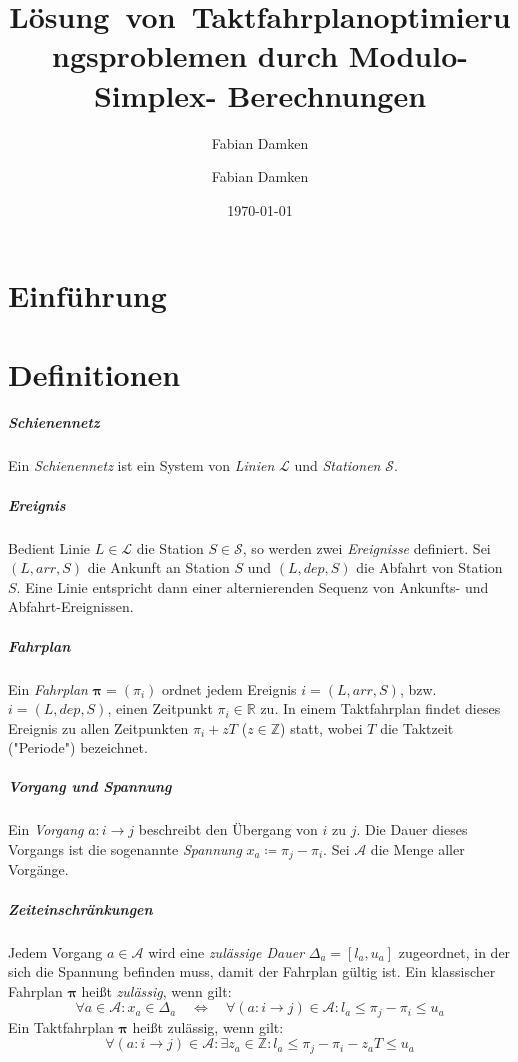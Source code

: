 \documentclass[accentcolor = tud11b, a4paper, 11pt, tudmathserif]{tudexercise}
\title{Lösung~von~Takt\-fahr\-plan\-op\-ti\-mie\-rungs\-pro\-ble\-men durch Mo\-du\-lo-Sim\-plex- Be\-rech\-nung\-en}
\subtitle{Fabian Damken}
\author{Fabian Damken}
\date{\today}
\newcommand{\arr}{\mathit{arr}}
\newcommand{\dep}{\mathit{dep}}
\newcommand{\R}{\ensuremath{\mathbb{R}}}
\newcommand{\Z}{\ensuremath{\mathbb{Z}}}
\renewcommand{\vec}[1]{\boldsymbol{\mathbf{#1}}}
\begin{document}
	

	\maketitle
	
	\section*{Einführung}

	\section*{Definitionen}
		\subparagraph{Schienennetz}
		Ein \emph{Schienennetz} ist ein System von \emph{Linien} \(\mathcal{L}\) und \emph{Stationen} \(\mathcal{S}\).
	
		\subparagraph{Ereignis}
		Bedient Linie \( L \in \mathcal{L} \) die Station \( S \in \mathcal{S} \), so werden zwei \emph{Ereignisse} definiert. Sei \( (L, \arr, S) \) die Ankunft an Station \(S\) und \( (L, \dep, S) \) die Abfahrt von Station \(S\). Eine Linie entspricht dann einer alternierenden Sequenz von Ankunfts- und Abfahrt-Ereignissen.
	
		\subparagraph{Fahrplan}
		Ein \emph{Fahrplan} \( \vec{\pi} = (\pi_i) \) ordnet jedem Ereignis \( i = (L, \arr, S) \), bzw. \( i = (L, \dep, S) \), einen Zeitpunkt \( \pi_i \in \R \) zu. In einem Taktfahrplan findet dieses Ereignis zu allen Zeitpunkten \( \pi_i + z T \) (\( z \in \Z \)) statt, wobei \( T \) die Taktzeit ("Periode") bezeichnet.
		
		\subparagraph{Vorgang und Spannung}
		Ein \emph{Vorgang} \( a : i \to j \) beschreibt den Übergang von \(i\) zu \(j\). Die Dauer dieses Vorgangs ist die sogenannte \emph{Spannung} \( x_a \coloneqq \pi_j - \pi_i \). Sei \(\mathcal{A}\) die Menge aller Vorgänge.
		
		\subparagraph{Zeiteinschränkungen}
		Jedem Vorgang \( a \in \mathcal{A} \) wird eine \emph{zulässige Dauer} \( \Delta_a = [l_a, u_a] \) zugeordnet, in der sich die Spannung befinden muss, damit der Fahrplan gültig ist. Ein klassischer Fahrplan \(\vec{\pi}\) heißt \emph{zulässig}, wenn gilt:
		\begin{equation*}
			\forall a \in \mathcal{A} : x_a \in \Delta_a \quad\iff\quad \forall (a : i \to j) \in \mathcal{A} : l_a \leq \pi_j - \pi_i \leq u_a
		\end{equation*}
		Ein Taktfahrplan \( \vec{\pi} \) heißt zulässig, wenn gilt:
		\begin{equation*}
			\forall (a : i \to j) \in \mathcal{A} : \exists z_a \in \Z : l_a \leq \pi_j - \pi_i - z_a T \leq u_a
		\end{equation*}
		
\end{document}
